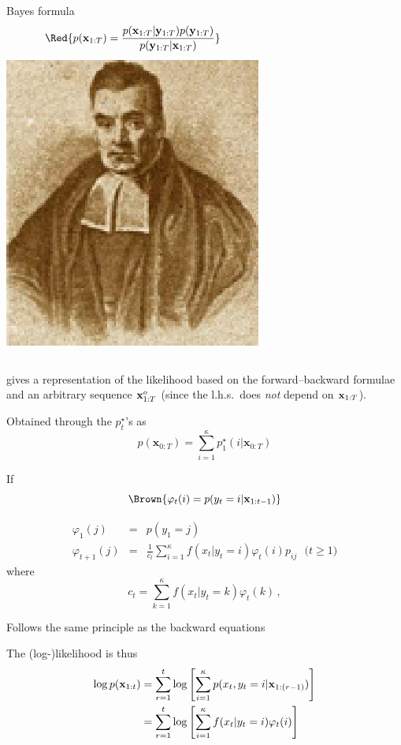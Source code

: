 \begin{slide}
\end{slide}\begin{slide}

\begin{columns}
Bayes formula
\[\Red{
p(\bx_{1:T}) = \frac{p(\bx_{1:T}|\by_{1:T}) p(\by_{1:T})}{p(\by_{1:T}|\bx_{1:T})}
}\]
\includegraphics[height=2.5truecm]{figures/TBayes}
\end{columns}
gives a representation of the likelihood based on the
forward--backward formulae and an arbitrary sequence $\mathbf{x}^o_{1:T}$ (since the
l.h.s.~does {\em not} depend on $\mathbf{x}_{1:T}$).

\vs\pause
Obtained through the $p^\star_{t}$'s as
$$
p(\mathbf{x}_{0:T}) = \sum_{i=1}^\kappa p^\star_1(i|\mathbf{x}_{0:T})
$$

\end{slide}\begin{slide}

If
$$\Brown{
  \varphi_t(i) = p(y_t =i|\bx_{1:t-1})
}$$

{}
\begin{eqnarray*}
 \varphi_1(j)  &=& p(y_1 = j) \nonumber\\
 \varphi_{t+1}(j) &=& \frac{1}{c_{t}}\sum_{i=1}^{\kappa} f(x_{t}|y_t=i)
  \varphi_{t}(i) p_{ij} \:\:\: \text{($t \ge 1$)}
\end{eqnarray*}
where
$$
  c_t = \sum_{k=1}^{\kappa} f(x_{t}|y_t=k) \varphi_{t}(k) \,,
$$

\end{slide}\begin{slide}
Follows the same principle as the backward equations

The (log-)likelihood is thus
\begin{align*}
\log p(\mathbf{x}_{1:t}) &= 
\sum_{r=1}^{t} \log \left[\sum_{i=1}^{\kappa} 
	p(x_t, y_t = i|\mathbf{x}_{1:(r-1)})\right] \nonumber\\
&= \sum_{r=1}^{t} \log \left[\sum_{i=1}^{\kappa} f(x_t|y_t=i) \varphi_t(i)\right]
\end{align*}

\end{slide}

